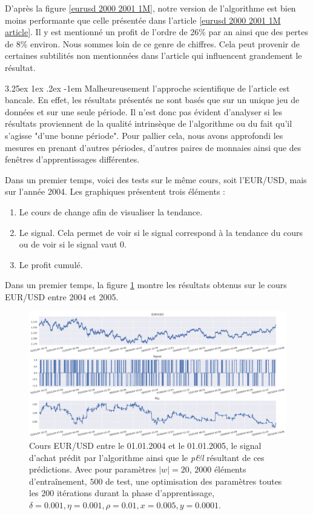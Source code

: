 \documentclass[a4paper, 11pt]{article}
\makeatletter
\renewcommand\paragraph{\@startsection{paragraph}{5}{\z@}%
  {3.25ex \@plus1ex \@minus.2ex}%
  {-1em}%
  {\normalfont\normalsize\bfseries}}
\makeatother
\begin{document}
 D'après la figure \ref{eurusd 2000 2001 1M}, notre version de l'algorithme est bien moins performante que celle présentée dans l'article \ref{eurusd 2000 2001 1M article}. Il y est mentionné un profit de l'ordre de 26\% par an ainsi que des pertes de 8\% environ. Nous sommes loin de ce genre de chiffres. Cela peut provenir de certaines subtilités non mentionnées dans l'article qui influencent grandement le résultat.
 
 \paragraph{}
 Malheureusement l'approche scientifique de l'article est bancale. En effet, les résultats présentés ne sont basés que sur un unique jeu de données et sur une seule période. Il n'est donc pas évident d'analyser si les résultats proviennent de la qualité intrinsèque de l'algorithme ou du fait qu'il s'agisse "d'une bonne période". Pour pallier cela, nous avons approfondi les mesures en prenant d'autres périodes, d'autres paires de monnaies ainsi que des fenêtres d'apprentissages différentes.
 
 Dans un premier temps, voici des tests sur le même cours, soit l'EUR/USD, mais sur l'année 2004.
 Les graphiques présentent trois éléments :
 \begin{enumerate}
  \item Le cours de change afin de visualiser la tendance.
  \item Le signal. Cela permet de voir si le signal correspond à la tendance du cours ou de voir si le signal vaut 0.
  \item Le profit cumulé.
 \end{enumerate}

Dans un premier temps, la figure \ref{eurusd 2004 2005} montre les résultats obtenus sur le cours EUR/USD entre 2004 et 2005.
 \begin{figure}
\centering
\includegraphics[scale=0.5]{res/eurusd_2004-2005}
\caption{Cours EUR/USD entre le 01.01.2004 et le 01.01.2005, le signal d'achat prédit par l'algorithme ainsi que le \textit{p\&l} résultant de ces prédictions. Avec pour paramètres $|w| = 20$, $2000$ éléments d'entraînement, $500$ de test, une optimisation des
paramètres toutes les $200$ itérations durant la phase d'apprentissage, $\delta = 0.001, \eta=0.001,\rho=0.01, x = 0.005, y=0.0001$.}
\label{eurusd 2004 2005}
\end{figure}
\end{document}
